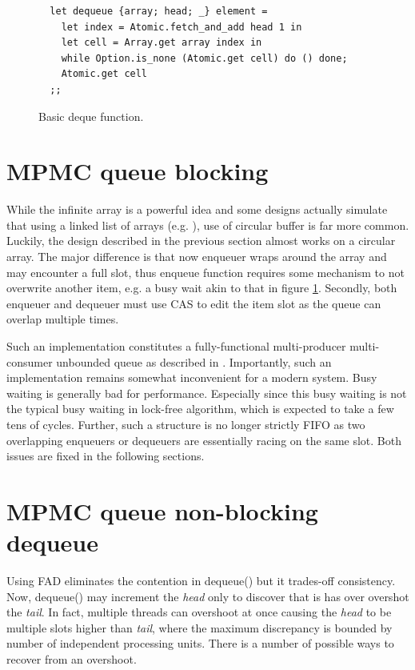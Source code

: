 \documentclass[12pt,a4paper,twoside]{report}
\begin{document}
\begin{figure} 
    \centering
    \begin{verbatim}
  let dequeue {array; head; _} element = 
    let index = Atomic.fetch_and_add head 1 in
    let cell = Array.get array index in 
    while Option.is_none (Atomic.get cell) do () done;
    Atomic.get cell
  ;;
    \end{verbatim}
    \caption{Basic deque function.}
    \label{fig:basic-deque}
\end{figure}

\section{MPMC queue blocking}
\label{section:blocking_mpmc}

While the infinite array is a powerful idea and some designs actually simulate that using a linked list of arrays (e.g. \cite{Sundell2011}), use of circular buffer is far more common. Luckily, the design described in the previous section almost works on a circular array. The major difference is that now enqueuer wraps around the array and may encounter a full slot, thus enqueue function requires some mechanism to not overwrite another item, e.g. a busy wait akin to that in figure \ref{fig:basic-deque}. Secondly, both enqueuer and dequeuer must use CAS to edit the item slot as the queue can overlap multiple times. 

Such an implementation constitutes a fully-functional multi-producer multi-consumer unbounded queue as described in \cite{Kappes2021}. Importantly, such an implementation remains somewhat inconvenient for a modern system. Busy waiting is generally bad for performance. Especially since this busy waiting is not the typical busy waiting in lock-free algorithm, which is expected to take a few tens of cycles. Further, such a structure is no longer strictly FIFO as two overlapping enqueuers or dequeuers are essentially racing on the same slot. Both issues are fixed in the following sections. 

\section{MPMC queue non-blocking dequeue}
\label{section:mpmc_non_blocking_dequeue}

Using FAD eliminates the contention in dequeue() but it trades-off consistency. Now, dequeue() may increment the \textit{head} only to discover that is has over overshot the \textit{tail}. In fact, multiple threads can overshoot at once causing the \textit{head} to be multiple slots higher than \textit{tail}, where the maximum discrepancy is bounded by number of independent processing units. There is a number of possible ways to recover from an overshoot.
\end{document}
